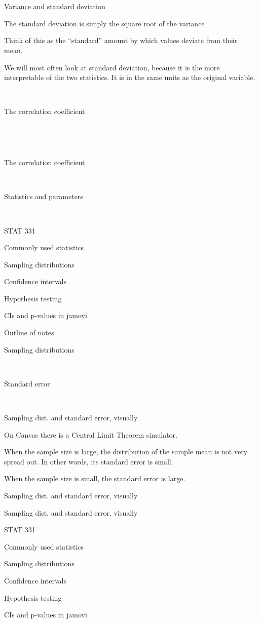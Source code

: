 \documentclass[
  letterpaper,
  DIV=11,
  numbers=noendperiod]{scrreprt}
\begin{document}
~

~

Variance and standard deviation

The standard deviation is simply the square root of the variance

Think of this as the ``standard'' amount by which values deviate from
their mean.

We will most often look at standard deviation, because it is the more
interpretable of the two statistics. It is in the same units as the
original variable.

~

The correlation coefficient

~

~

The correlation coefficient

~

Statistics and parameters

~

STAT 331

Commonly used statistics

Sampling distributions

Confidence intervals

Hypothesis testing

CIs and p-values in jamovi

Outline of notes

Sampling distributions

~

Standard error

~

Sampling dist. and standard error, visually

On Canvas there is a Central Limit Theorem simulator.

When the sample size is large, the distribution of the sample mean is
not very spread out. In other words, its standard error is small.

When the sample size is small, the standard error is large.

Sampling dist. and standard error, visually

Sampling dist. and standard error, visually

STAT 331

Commonly used statistics

Sampling distributions

Confidence intervals

Hypothesis testing

CIs and p-values in jamovi
\end{document}
